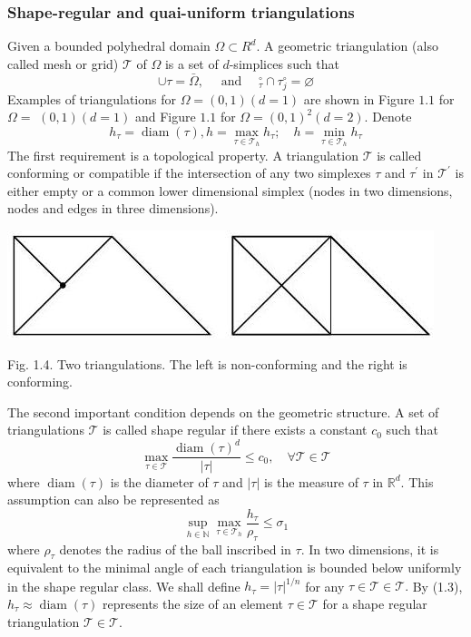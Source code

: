 \documentclass[10pt]{article}
\begin{document}
\subsubsection{Shape-regular and quai-uniform triangulations}
Given a bounded polyhedral domain $\Omega \subset R^{d}$. A geometric triangulation (also called mesh or grid) $\mathcal{T}$ of $\Omega$ is a set of $d$-simplices such that
$$
\cup \tau=\bar{\Omega}, \quad \text { and } \quad{ }_{\tau}^{\circ} \cap{\tau}_{j}^{\circ}=\varnothing
$$
Examples of triangulations for $\Omega=(0,1)(d=1)$ are shown in Figure $1.1$ for $\Omega=$ $(0,1)(d=1)$ and Figure $1.1$ for $\Omega=(0,1)^{2}(d=2)$. Denote
$$
h_{\tau}=\operatorname{diam}(\tau), h=\max _{\tau \in \mathcal{T}_{h}} h_{\tau} ; \quad h=\min _{\tau \in \mathcal{T}_{h}} h_{\tau}
$$
The first requirement is a topological property. A triangulation $\mathcal{T}$ is called conforming or compatible if the intersection of any two simplexes $\tau$ and $\tau^{\prime}$ in $\mathcal{T}^{\prime}$ is either empty or a common lower dimensional simplex (nodes in two dimensions, nodes and edges in three dimensions).

\includegraphics[max width=\textwidth]{2022_01_05_15c63bf4a948497c30d9g-07}

Fig. 1.4. Two triangulations. The left is non-conforming and the right is conforming.

The second important condition depends on the geometric structure. A set of triangulations $\mathscr{T}$ is called shape regular if there exists a constant $c_{0}$ such that
$$
\max _{\tau \in \mathcal{T}} \frac{\operatorname{diam}(\tau)^{d}}{|\tau|} \leq c_{0}, \quad \forall \mathcal{T} \in \mathscr{T}
$$
where $\operatorname{diam}(\tau)$ is the diameter of $\tau$ and $|\tau|$ is the measure of $\tau$ in $\mathbb{R}^{d}$. This assumption can also be represented as
$$
\sup _{h \in \mathbb{N}} \max _{\tau \in \mathcal{T}_{h}} \frac{h_{\tau}}{\rho_{\tau}} \leq \sigma_{1}
$$
where $\rho_{\tau}$ denotes the radius of the ball inscribed in $\tau$. In two dimensions, it is equivalent to the minimal angle of each triangulation is bounded below uniformly in the shape regular class. We shall define $h_{\tau}=|\tau|^{1 / n}$ for any $\tau \in \mathcal{T} \in \mathscr{T} .$ By (1.3), $h_{\tau} \approx \operatorname{diam}(\tau)$ represents the size of an element $\tau \in \mathcal{T}$ for a shape regular triangulation $\mathcal{T} \in \mathscr{T}$.
\end{document}
